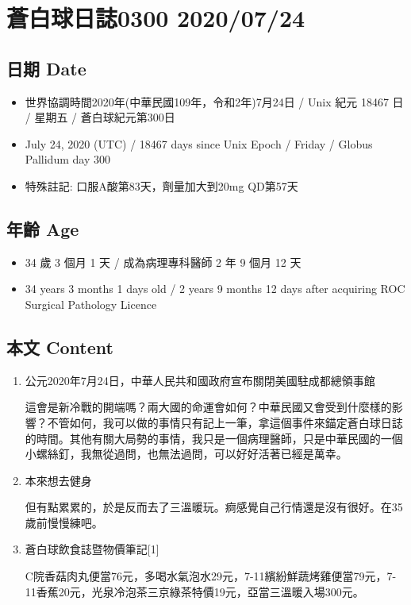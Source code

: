 \documentclass[
]{article}
\providecommand{\tightlist}{%
  \setlength{\itemsep}{0pt}\setlength{\parskip}{0pt}}
\begin{document}
\hypertarget{ux84bcux767dux7403ux65e5ux8a8c0300-20200724}{%
\section{蒼白球日誌0300
2020/07/24}\label{ux84bcux767dux7403ux65e5ux8a8c0300-20200724}}

\hypertarget{ux65e5ux671f-date-23}{%
\subsection{日期 Date}\label{ux65e5ux671f-date-23}}

\begin{itemize}
\tightlist
\item
  世界協調時間2020年(中華民國109年，令和2年)7月24日 / Unix 紀元 18467 日
  / 星期五 / 蒼白球紀元第300日
\item
  July 24, 2020 (UTC) / 18467 days since Unix Epoch / Friday / Globus
  Pallidum day 300
\item
  特殊註記: 口服A酸第83天，劑量加大到20mg QD第57天
\end{itemize}

\hypertarget{ux5e74ux9f61-age-23}{%
\subsection{年齡 Age}\label{ux5e74ux9f61-age-23}}

\begin{itemize}
\tightlist
\item
  34 歲 3 個月 1 天 / 成為病理專科醫師 2 年 9 個月 12 天
\item
  34 years 3 months 1 days old / 2 years 9 months 12 days after
  acquiring ROC Surgical Pathology Licence
\end{itemize}

\hypertarget{ux672cux6587-content-23}{%
\subsection{本文 Content}\label{ux672cux6587-content-23}}

\begin{enumerate}
\def\labelenumi{\arabic{enumi}.}
\item
  公元2020年7月24日，中華人民共和國政府宣布關閉美國駐成都總領事館

  這會是新冷戰的開端嗎？兩大國的命運會如何？中華民國又會受到什麼樣的影響？不管如何，我可以做的事情只有記上一筆，拿這個事件來錨定蒼白球日誌的時間。其他有關大局勢的事情，我只是一個病理醫師，只是中華民國的一個小螺絲釘，我無從過問，也無法過問，可以好好活著已經是萬幸。
\item
  本來想去健身

  但有點累累的，於是反而去了三溫暖玩。痾感覺自己行情還是沒有很好。在35歲前慢慢練吧。
\item
  蒼白球飲食誌暨物價筆記{[}1{]}

  C院香菇肉丸便當76元，多喝水氣泡水29元，7-11繽紛鮮蔬烤雞便當79元，7-11香蕉20元，光泉冷泡茶三京綠茶特價19元，亞當三溫暖入場300元。
\end{enumerate}
\end{document}
